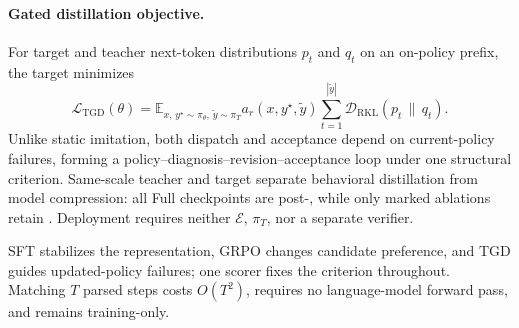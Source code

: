 \paragraph{Gated distillation objective.}
For target and teacher next-token distributions $p_t$ and $q_t$ on an on-policy prefix, the target minimizes
\begin{equation}
\label{eq:tgd}
\mathcal{L}_{\mathrm{TGD}}(\theta)=
\mathbb{E}_{x,\,y^{\star}\sim\pi_\theta,\,\widetilde y\sim\pi_T}
a_r(x,y^{\star},\widetilde y)\sum_{t=1}^{|\widetilde y|}
\mathcal{D}_{\mathrm{RKL}}\!\left(p_t\,\|\,q_t\right).
\end{equation}
Unlike static imitation, both dispatch and acceptance depend on current-policy failures, forming a policy--diagnosis--revision--acceptance loop under one structural criterion. Same-scale teacher and target separate behavioral distillation from model compression: all Full checkpoints are post-\tgd, while only marked ablations retain \tgd. Deployment requires neither $\mathcal{E}$, $\pi_T$, nor a separate verifier.

SFT stabilizes the representation, GRPO changes candidate preference, and TGD guides updated-policy failures; one scorer fixes the criterion throughout. Matching $T$ parsed steps costs $O(T^2)$, requires no language-model forward pass, and remains training-only.
